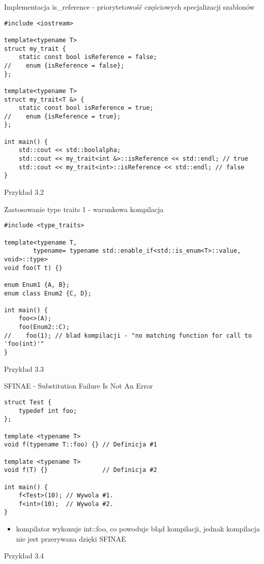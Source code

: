 \documentclass[11pt]{beamer}
\begin{document}
\begin{frame}[fragile]{Implementacja is\_reference - priorytetowość częściowych specjalizacji szablonów}
 \begin{lstlisting}[frame=single,basicstyle=\tiny]
#include <iostream>

template<typename T>
struct my_trait {
    static const bool isReference = false;
//    enum {isReference = false};
};

template<typename T>
struct my_trait<T &> {
    static const bool isReference = true;
//    enum {isReference = true};
};

int main() {
    std::cout << std::boolalpha;
    std::cout << my_trait<int &>::isReference << std::endl; // true
    std::cout << my_trait<int>::isReference << std::endl; // false
}
 \end{lstlisting}
\alert{Przykład 3.2}
\end{frame}

\begin{frame}[fragile]{Zastosowanie type traits 1 - warunkowa kompilacja}
 \begin{lstlisting}[frame=single,basicstyle=\tiny]
#include <type_traits>

template<typename T,
        typename= typename std::enable_if<std::is_enum<T>::value, void>::type>
void foo(T t) {}

enum Enum1 {A, B};
enum class Enum2 {C, D};

int main() {
    foo<>(A);
    foo(Enum2::C);
//    foo(1); // blad kompilacji - "no matching function for call to 'foo(int)'"
}
    \end{lstlisting}
    
    \alert{Przykład 3.3}
\end{frame}

\begin{frame}[fragile]{SFINAE - Substitution Failure Is Not An Error}
    \begin{lstlisting}[frame=single,basicstyle=\tiny]
struct Test {
    typedef int foo;
};

template <typename T> 
void f(typename T::foo) {} // Definicja #1

template <typename T> 
void f(T) {}               // Definicja #2

int main() {
    f<Test>(10); // Wywola #1.
    f<int>(10);  // Wywola #2.
}
    \end{lstlisting}
    
    \begin{itemize}
     \item kompilator wykonuje int::foo, co powoduje błąd kompilacji, jednak kompilacja nie jest przerywana dzięki SFINAE
    \end{itemize}

    \alert{Przykład 3.4}
\end{frame}
\end{document}

